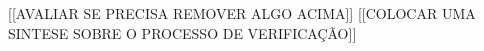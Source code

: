 \documentclass[a4paper]{llncs}
\begin{document}
[[AVALIAR SE PRECISA REMOVER ALGO ACIMA]]
[[COLOCAR UMA SINTESE SOBRE O PROCESSO DE VERIFICAÇÃO]]

\end{document}
